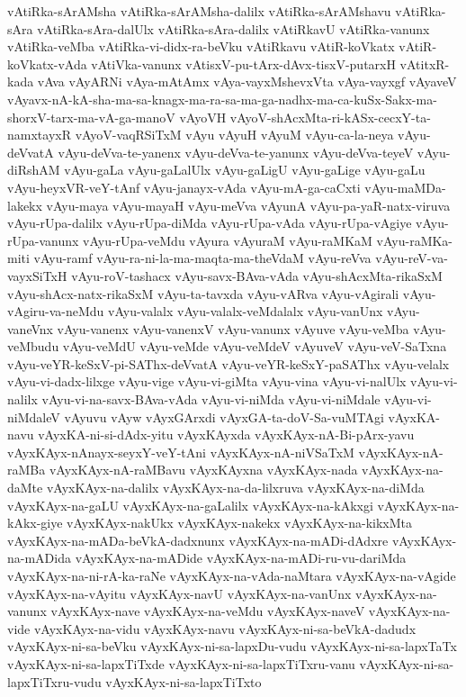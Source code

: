{vAtiRka-sArAMsha
vAtiRka-sArAMsha-dalilx
vAtiRka-sArAMshavu
vAtiRka-sAra
vAtiRka-sAra-dalUlx
vAtiRka-sAra-dalilx
vAtiRkavU
vAtiRka-vanunx
vAtiRka-veMba
vAtiRka-vi-didx-ra-beVku
vAtiRkavu
vAtiR-koVkatx
vAtiR-koVkatx-vAda
vAtiVka-vanunx
vAtisxV-pu-tArx-dAvx-tisxV-putarxH
vAtitxR-kada
vAva
vAyARNi
vAya-mAtAmx
vAya-vayxMshevxVta
vAya-vayxgf
vAyaveV
vAyavx-nA-kA-sha-ma-sa-knagx-ma-ra-sa-ma-ga-nadhx-ma-ca-kuSx-Sakx-ma-shorxV-tarx-ma-vA-ga-manoV
vAyoVH
vAyoV-shAcxMta-ri-kASx-cecxY-ta-namxtayxR
vAyoV-vaqRSiTxM
vAyu
vAyuH
vAyuM
vAyu-ca-la-neya
vAyu-deVvatA
vAyu-deVva-te-yanenx
vAyu-deVva-te-yanunx
vAyu-deVva-teyeV
vAyu-diRshAM
vAyu-gaLa
vAyu-gaLalUlx
vAyu-gaLigU
vAyu-gaLige
vAyu-gaLu
vAyu-heyxVR-veY-tAnf
vAyu-janayx-vAda
vAyu-mA-ga-caCxti
vAyu-maMDa-lakekx
vAyu-maya
vAyu-mayaH
vAyu-meVva
vAyunA
vAyu-pa-yaR-natx-viruva
vAyu-rUpa-dalilx
vAyu-rUpa-diMda
vAyu-rUpa-vAda
vAyu-rUpa-vAgiye
vAyu-rUpa-vanunx
vAyu-rUpa-veMdu
vAyura
vAyuraM
vAyu-raMKaM
vAyu-raMKa-miti
vAyu-ramf
vAyu-ra-ni-la-ma-maqta-ma-theVdaM
vAyu-reVva
vAyu-reV-va-vayxSiTxH
vAyu-roV-tashacx
vAyu-savx-BAva-vAda
vAyu-shAcxMta-rikaSxM
vAyu-shAcx-natx-rikaSxM
vAyu-ta-tavxda
vAyu-vARva
vAyu-vAgirali
vAyu-vAgiru-va-neMdu
vAyu-valalx
vAyu-valalx-veMdalalx
vAyu-vanUnx
vAyu-vaneVnx
vAyu-vanenx
vAyu-vanenxV
vAyu-vanunx
vAyuve
vAyu-veMba
vAyu-veMbudu
vAyu-veMdU
vAyu-veMde
vAyu-veMdeV
vAyuveV
vAyu-veV-SaTxna
vAyu-veYR-keSxV-pi-SAThx-deVvatA
vAyu-veYR-keSxY-paSAThx
vAyu-velalx
vAyu-vi-dadx-lilxge
vAyu-vige
vAyu-vi-giMta
vAyu-vina
vAyu-vi-nalUlx
vAyu-vi-nalilx
vAyu-vi-na-savx-BAva-vAda
vAyu-vi-niMda
vAyu-vi-niMdale
vAyu-vi-niMdaleV
vAyuvu
vAyw
vAyxGArxdi
vAyxGA-ta-doV-Sa-vuMTAgi
vAyxKA-navu
vAyxKA-ni-si-dAdx-yitu
vAyxKAyxda
vAyxKAyx-nA-Bi-pArx-yavu
vAyxKAyx-nAnayx-seyxY-veY-tAni
vAyxKAyx-nA-niVSaTxM
vAyxKAyx-nA-raMBa
vAyxKAyx-nA-raMBavu
vAyxKAyxna
vAyxKAyx-nada
vAyxKAyx-na-daMte
vAyxKAyx-na-dalilx
vAyxKAyx-na-da-lilxruva
vAyxKAyx-na-diMda
vAyxKAyx-na-gaLU
vAyxKAyx-na-gaLalilx
vAyxKAyx-na-kAkxgi
vAyxKAyx-na-kAkx-giye
vAyxKAyx-nakUkx
vAyxKAyx-nakekx
vAyxKAyx-na-kikxMta
vAyxKAyx-na-mADa-beVkA-dadxnunx
vAyxKAyx-na-mADi-dAdxre
vAyxKAyx-na-mADida
vAyxKAyx-na-mADide
vAyxKAyx-na-mADi-ru-vu-dariMda
vAyxKAyx-na-ni-rA-ka-raNe
vAyxKAyx-na-vAda-naMtara
vAyxKAyx-na-vAgide
vAyxKAyx-na-vAyitu
vAyxKAyx-navU
vAyxKAyx-na-vanUnx
vAyxKAyx-na-vanunx
vAyxKAyx-nave
vAyxKAyx-na-veMdu
vAyxKAyx-naveV
vAyxKAyx-na-vide
vAyxKAyx-na-vidu
vAyxKAyx-navu
vAyxKAyx-ni-sa-beVkA-dadudx
vAyxKAyx-ni-sa-beVku
vAyxKAyx-ni-sa-lapxDu-vudu
vAyxKAyx-ni-sa-lapxTaTx
vAyxKAyx-ni-sa-lapxTiTxde
vAyxKAyx-ni-sa-lapxTiTxru-vanu
vAyxKAyx-ni-sa-lapxTiTxru-vudu
vAyxKAyx-ni-sa-lapxTiTxto
}
